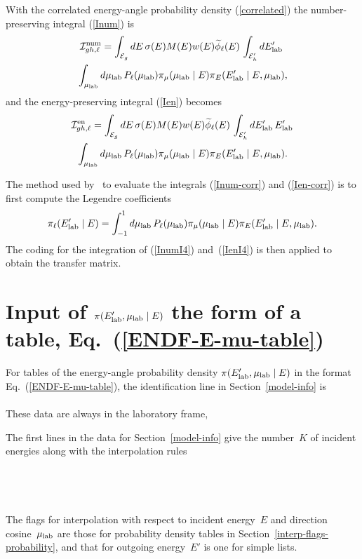 With the correlated energy-angle probability density
(\ref{correlated}) the number-preserving integral (\ref{Inum}) is
\begin{multline}
   {\cal I}^{\text{num}}_{gh,\ell} =
        \int_{{\cal E}_g} dE \, \sigma ( E ) M(E) w(E) \widetilde \phi_\ell(E) 
       \, \int_{{\cal E}_h' } dE_{\text{lab}}' \, \\
       \, \int_{\mu_{\text{lab}}} d\mu_{\text{lab}} \,  P_\ell( \mu_{\text{lab}} ) \pi_\mu(\mu_{\text{lab}} \mid E)\pi_E(E_{\text{lab}}' \mid E, \mu_{\text{lab}}),
  \label{Inum-corr}
\end{multline}
and the energy-preserving integral (\ref{Ien}) becomes
\begin{multline}
  {\cal I}^{\text{en}}_{gh,\ell} =
     \int_{{\cal E}_g} dE \, \sigma ( E ) M(E) w(E) \widetilde \phi_\ell(E) 
     \, \int_{{\cal E}_h' } dE_{\text{lab}}' \,  E_{\text{lab}}' \\
     \, \int_{\mu_{\text{lab}}} d\mu_{\text{lab}}  \,  P_\ell ( \mu_{\text{lab}} ) \pi_\mu(\mu_{\text{lab}} \mid E)\pi_E(E_{\text{lab}}' \mid E, \mu_{\text{lab}}).
  \label{Ien-corr}
\end{multline}

The method used by \gettransfer\ to evaluate the integrals (\ref{Inum-corr})
and (\ref{Ien-corr}) is to first compute the Legendre coefficients
\begin{equation}
  \pi_\ell(E_{\text{lab}}' \mid E) =
  \int_{-1}^1 d\mu_{\text{lab}}  \,  P_\ell ( \mu_{\text{lab}} ) \pi_\mu(\mu_{\text{lab}} \mid E)\pi_E(E_{\text{lab}}' \mid E, \mu_{\text{lab}}).
  \label{get-I4}
\end{equation}
The coding for the integration of (\ref{InumI4})
and~(\ref{IenI4}) is then applied to obtain the transfer matrix.

\section{Input of $\pi(E_{\text{lab}}', \mu_{\text{lab}} \mid E)$ the form of a table, Eq.~(\ref{ENDF-E-mu-table})}
For tables of the energy-angle probability density $\pi(E_{\text{lab}}', \mu_{\text{lab}} \mid E)$
in the format Eq.~(\ref{ENDF-E-mu-table}), the identification line in
Section~\ref{model-info} is\\
      \\
These data are always in the laboratory frame,\\

The first lines in the data for Section~\ref{model-info} give the number~$K$
of incident energies along with the interpolation rules\\
  \\
  \\
  \\
  \\
The flags for interpolation with respect to incident energy~$E$ and
direction cosine~$\mu_{\text{lab}}$ are those for probability density tables in
Section~\ref{interp-flags-probability}, and that for outgoing energy~$E'$ is
one for simple lists.

